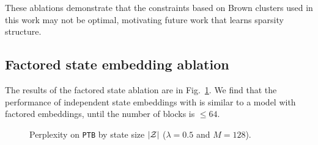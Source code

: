 \documentclass[11pt,a4paper]{article}
\begin{document}
These ablations demonstrate that the constraints based on
Brown clusters used in this work may not be optimal,
motivating future work that learns sparsity structure.

\subsection{Factored state embedding ablation}
The results of the factored state ablation are in Fig.~\ref{fig:fac-ablation}.
We find that the performance of independent state embeddings with
is similar to a model with factored embeddings,
until the number of blocks is $\le 64$.

\begin{figure}[h]
\centering
{}
\caption{\label{fig:fac-ablation}
Perplexity on \texttt{PTB} by state size $|\mathcal{Z}|$ ($\lambda =0.5$ and $M=128$).
}
\end{figure}
\end{document}
